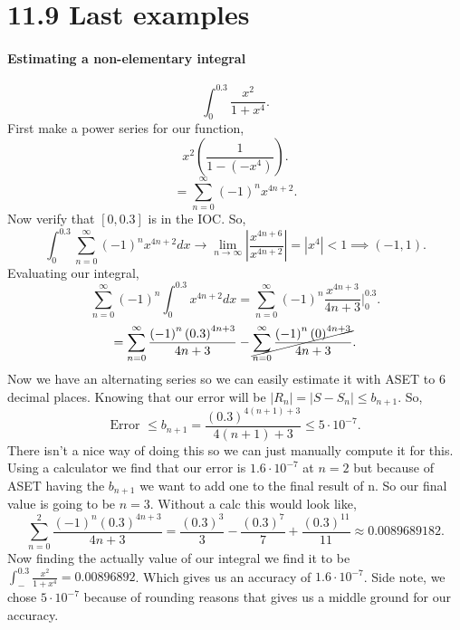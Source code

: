 \section{11.9 Last examples}%
\label{sec:11.9 Last example}
\paragraph{Estimating a non-elementary integral}
\[
\int_{ 0 }^{ 0.3 } \frac{ x^2 }{ 1+x^{ 4 } }
.\] 
First make a power series for our function,
\[
x^2\left( \frac{ 1 }{ 1-\left( -x^{ 4 } \right)  }  \right) 
.\] 
\[
=\sum_{ n=0 } ^{ \infty } \left( -1 \right) ^{ n }x^{ 4n+2 }
.\] 
Now verify that $ \left[ 0,0.3 \right]  $ is in the IOC. So,
\[
\int_{ 0 }^{ 0.3 } \sum_{ n=0 } ^{ \infty } \left( -1 \right) ^{ n }x^{ 4n+2 }dx \to \lim_{ n \to \infty} \left| \frac{ x^{ 4n+6 } }{ x^{ 4n+2 } } \right|= \left| x^{ 4 } \right| < 1 \implies \left( -1,1 \right) 
.\] 
Evaluating our integral,
\[
\sum_{ n=0 } ^{ \infty } \left( -1 \right) ^{ n }\int_{ 0 }^{ 0.3 } x^{ 4n+2 }dx = \sum_{ n=0 } ^{ \infty } \left( -1 \right) ^{ n } \frac{ x^{ 4n+3 } }{ 4n + 3 } \bigg| _{ 0 }^{ 0.3 }
.\] 
\[
	=\sum_{ n=0 } ^{ \infty } \frac{ \left( -1 \right) ^{ n } \left( 0.3 \right) ^{ 4n+3 } }{ 4n+3 } - \cancel{\sum_{ n=0 } ^{ \infty } \frac{ \left( -1 \right) ^{ n }\left( 0 \right) ^{ 4n+3 } }{ 4n+3 }}
.\] 
Now we have an alternating series so we can easily estimate it with ASET to 6 decimal places. Knowing that our error will be $ \left| R_n \right|= \left| S-S_n \right| \le b_{ n+1 } $. So,
\[
\text{Error }\le b_{ n+1 } = \frac{ \left( 0.3 \right) ^{ 4\left( n+1 \right) +3 } }{ 4\left( n+1 \right) +3 } \le 5\cdot 10^{ -7 }
.\] 
There isn't a nice way of doing this so we can just manually compute it for this. Using a calculator we find that our error is $ 1.6\cdot 10^{ -7 } $ at $ n=2 $ but because of ASET having the $ b_{ n+1 } $ we want to add one to the final result of n. So our final value is going to be $ n=3 $. Without a calc this would look like,
\[
\sum_{ n=0 } ^{ 2 } \frac{ \left( -1 \right) ^{ n }\left( 0.3 \right) ^{ 4n+3 } }{ 4n+3 } = \frac{ \left( 0.3 \right) ^{ 3 } }{ 3 } - \frac{ \left( 0.3 \right) ^{ 7 } }{ 7 } + \frac{ \left( 0.3 \right) ^{ 11 } }{ 11 } \approx 0.0089689182
.\] 
\newpage
Now finding the actually value of our integral we find it to be $ \int_{ - }^{ 0.3 } \frac{ x^2 }{ 1+x^{ 4 } } = 0.00896892$. Which gives us an accuracy of $ 1.6\cdot 10^{ -7 } $. Side note, we chose $ 5\cdot 10^{ -7 } $ because of rounding reasons that gives us a middle ground for our accuracy. \\
